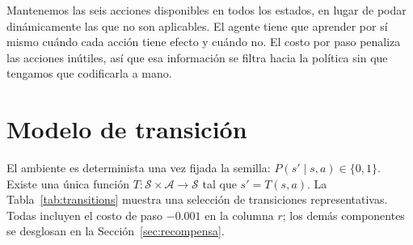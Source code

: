\documentclass[11pt,a4paper]{article}
\begin{document}
Mantenemos las seis acciones disponibles en todos los estados, en lugar de
podar dinámicamente las que no son aplicables. El agente tiene que aprender
por sí mismo cuándo cada acción tiene efecto y cuándo no. El costo por paso
penaliza las acciones inútiles, así que esa información se filtra hacia la
política sin que tengamos que codificarla a mano.

\section{Modelo de transición}
\label{sec:transicion}

El ambiente es determinista una vez fijada la semilla:
\(P(s' \mid s, a) \in \{0, 1\}\). Existe una única función
\(T : \mathcal{S}\times\mathcal{A} \to \mathcal{S}\) tal que
\(s' = T(s, a)\). La Tabla~\ref{tab:transitions} muestra una selección de
transiciones representativas. Todas incluyen el costo de paso \(-0.001\) en
la columna \(r\); los demás componentes se desglosan en la
Sección~\ref{sec:recompensa}.
\end{document}
